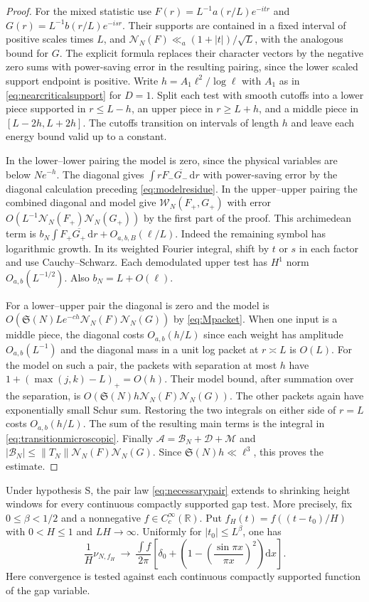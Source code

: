 \documentclass[11pt,a4paper]{article}
\numberwithin{equation}{section}
\newcommand{\SSS}{\mathfrak S}
\newcommand{\ud}{\mathrm d}
\newcommand{\B}{\mathcal B_N}
\newcommand{\NN}{\mathcal N_N}
\begin{document}
\begin{proof}
For the mixed statistic use
$F(r)=L^{-1}a(r/L)e^{-itr}$ and
$G(r)=L^{-1}b(r/L)e^{-isr}$. Their supports are contained
in a fixed interval of positive scales times $L$, and
$\NN(F)\ll_a(1+|t|)/\sqrt L$, with the analogous bound
for $G$. The explicit formula replaces their character
vectors by the negative zero sums with power-saving
error in the resulting pairing, since the lower
scaled support endpoint is positive. Write
$h=A_1\ell^2/\log\ell$ with $A_1$ as in
\cref{eq:nearcriticalsupport} for $D=1$. Split each test
with smooth cutoffs into a lower piece supported in
$r\le L-h$, an upper piece in $r\ge L+h$, and a middle
piece in $[L-2h,L+2h]$. The cutoffs transition on
intervals of length $h$ and leave each energy bound valid
up to a constant.

In the lower--lower pairing the model is zero, since
the physical variables are below $Ne^{-h}$.
The diagonal gives $\int rF_-\overline{G_-}\,\ud r$
with power-saving error by the diagonal calculation
preceding \cref{eq:modelresidue}. In the upper--upper
pairing the combined diagonal and model give
$\mathcal W_N(F_+,G_+)$ with error
$O(L^{-1}\NN(F_+)\NN(G_+))$ by the first part of the proof.
This archimedean term is
$b_N\int F_+\overline{G_+}\,\ud r+O_{a,b,B}(\ell/L)$.
Indeed the remaining symbol has logarithmic growth.
In its weighted Fourier integral, shift by $t$ or $s$
in each factor and use Cauchy--Schwarz. Each demodulated
upper test has $H^1$ norm $O_{a,b}(L^{-1/2})$.
Also $b_N=L+O(\ell)$.

For a lower--upper pair the diagonal is zero and the
model is $O(\SSS(N)L e^{-c h}\NN(F)\NN(G))$ by
\cref{eq:Mpacket}. When one input is a middle piece,
the diagonal costs $O_{a,b}(h/L)$ since each weight has
amplitude $O_{a,b}(L^{-1})$ and the diagonal mass in a
unit log packet at $r\asymp L$ is $O(L)$.
For the model on such a pair, the packets with separation
at most $h$ have $1+(\max(j,k)-L)_+=O(h)$.
Their model bound, after summation over the separation,
is $O(\SSS(N)h\NN(F)\NN(G))$.
The other packets again have exponentially small Schur sum.
Restoring the two integrals on either side of $r=L$
costs $O_{a,b}(h/L)$. The sum of the resulting main terms is
the integral in \cref{eq:transitionmicroscopic}.
Finally $\mathcal A=\B+\mathcal D+\mathcal M$ and
$|\B|\le\|T_N\|\NN(F)\NN(G)$. Since
$\SSS(N)h\ll\ell^3$, this proves the estimate.
\end{proof}

Under hypothesis S, the pair law \eqref{eq:necessarypair}
extends to shrinking height windows for every continuous
compactly supported gap test. More precisely, fix
$0\le\beta<1/2$ and a nonnegative $f\in C_c^\infty(\mathbb R)$.
Put $f_H(t)=f((t-t_0)/H)$ with $0<H\le1$ and $LH\to\infty$.
Uniformly for $|t_0|\le L^\beta$, one has
\begin{equation}
 \frac1H\nu_{N,f_H}
  \ \longrightarrow\
  \frac{\int f}{2\pi}
      \left[\delta_0+
         \left(1-\left(\frac{\sin\pi x}{\pi x}\right)^2\right)
        \ud x\right].
 \label{eq:fullpairshrinking}
\end{equation}
Here convergence is tested against each continuous compactly
supported function of the gap variable.
\end{document}
